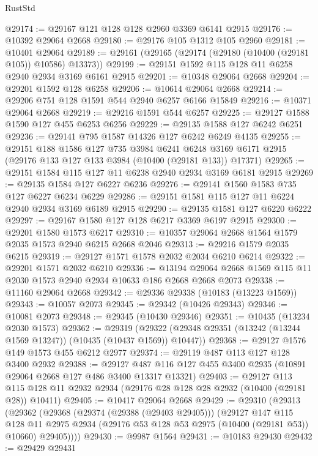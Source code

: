 \begin{lexlean}{RustStd}
\begin{coremodule}
@29174 := @29167 @121 @128 @128 @2960 @3369 @6141 @2915
@29176 := @10392 @29064 @2668
@29180 := @29176 @105 @1312 @105 @2960
@29181 := @10401 @29064
@29189 := @29161 (@29165 (@29174 (@29180 (@10400 (@29181 @105)) @10586) @13373))
@29199 := @29151 @1592 @115 @128 @11 @6258 @2940 @2934 @3169 @6161 @2915
@29201 := @10348 @29064 @2668
@29204 := @29201 @1592 @128 @6258
@29206 := @10614 @29064 @2668
@29214 := @29206 @751 @128 @1591 @544 @2940 @6257 @6166 @15849
@29216 := @10371 @29064 @2668
@29219 := @29216 @1591 @544 @6257
@29225 := @29127 @1588 @1590 @127 @455 @6253 @6256
@29229 := @29135 @1588 @127 @6242 @6251
@29236 := @29141 @795 @1587 @14326 @127 @6242 @6249 @4135
@29255 := @29151
    @188
    @1586
    @127
    @735
    @3984
    @6241
    @6248
    @3169
    @6171
    @2915
    (@29176 @133 @127 @133 @3984 (@10400 (@29181 @133)) @17371)
@29265 := @29151 @1584 @115 @127 @11 @6238 @2940 @2934 @3169 @6181 @2915
@29269 := @29135 @1584 @127 @6227 @6236
@29276 := @29141 @1560 @1583 @735 @127 @6227 @6234 @6229
@29286 := @29151 @1581 @115 @127 @11 @6224 @2940 @2934 @3169 @6189 @2915
@29290 := @29135 @1581 @127 @6220 @6222
@29297 := @29167 @1580 @127 @128 @6217 @3369 @6197 @2915
@29300 := @29201 @1580 @1573 @6217
@29310 := @10357 @29064 @2668 @1564 @1579 @2035 @1573 @2940 @6215 @2668 @2046
@29313 := @29216 @1579 @2035 @6215
@29319 := @29127 @1571 @1578 @2032 @2034 @6210 @6214
@29322 := @29201 @1571 @2032 @6210
@29336 := @13194 @29064 @2668 @1569 @115 @11 @2030 @1573 @2940 @2934 @10633 @186 @2668 @2668 @2073
@29338 := @11160 @29064 @2668
@29342 := @29336 @29338 (@10183 (@13223 @1569))
@29343 := @10057 @2073
@29345 := @29342 (@10426 @29343)
@29346 := @10081 @2073
@29348 := @29345 (@10430 @29346)
@29351 := @10435 (@13234 @2030 @1573)
@29362 := @29319
    (@29322 (@29348 @29351 (@13242 (@13244 @1569 @13247)) (@10435 (@10437 @1569)) @10447))
@29368 := @29127 @1576 @149 @1573 @455 @6212 @2977
@29374 := @29119 @487 @113 @127 @128 @3400 @2932
@29388 := @29127 @487 @116 @127 @455 @3400 @2935 (@10891 @29064 @2668 @127 @486 @3400 @13317 @13321)
@29403 := @29127
    @113
    @115
    @128
    @11
    @2932
    @2934
    (@29176 @28 @128 @28 @2932 (@10400 (@29181 @28)) @10411)
@29405 := @10417 @29064 @2668
@29429 := @29310
    (@29313
      (@29362
        (@29368
          (@29374 (@29388 (@29403 @29405)))
          (@29127
            @147
            @115
            @128
            @11
            @2975
            @2934
            (@29176 @53 @128 @53 @2975 (@10400 (@29181 @53)) @10660)
            @29405))))
@29430 := @9987 @1564
@29431 := @10183 @29430
@29432 := @29429 @29431

\end{coremodule}
\end{lexlean}
